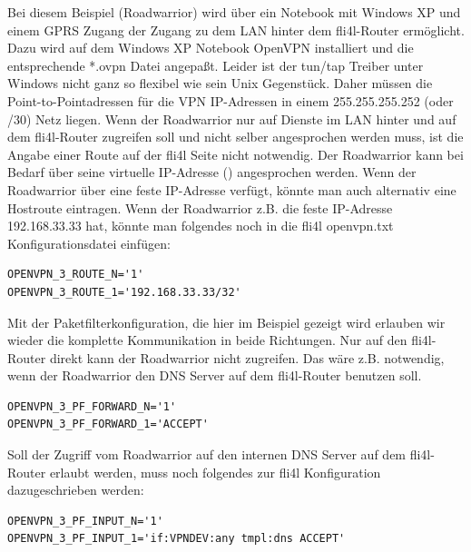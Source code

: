 Bei diesem Beispiel (Roadwarrior) wird über ein
Notebook mit Windows XP und einem GPRS Zugang der Zugang zu dem LAN
hinter dem fli4l-Router ermöglicht.  Dazu wird auf dem Windows XP
Notebook OpenVPN installiert und die entsprechende *.ovpn Datei
angepaßt.  Leider ist der tun/tap Treiber unter Windows nicht ganz so
flexibel wie sein Unix Gegenstück. Daher müssen die
Point-to-Pointadressen für die VPN IP-Adressen in einem
255.255.255.252 (oder /30) Netz liegen. Wenn der Roadwarrior nur auf
Dienste im LAN hinter und auf dem fli4l-Router zugreifen soll und
nicht selber angesprochen werden muss, ist die Angabe einer Route auf
der fli4l Seite nicht notwendig. Der Roadwarrior kann bei Bedarf über
seine virtuelle IP-Adresse ()
angesprochen werden. Wenn der Roadwarrior über eine feste IP-Adresse
verfügt, könnte man auch alternativ eine Hostroute eintragen. Wenn der
Roadwarrior z.B. die feste IP-Adresse 192.168.33.33 hat, könnte man
folgendes noch in die fli4l openvpn.txt Konfigurationsdatei einfügen:

\begin{example}
\begin{verbatim}
OPENVPN_3_ROUTE_N='1'
OPENVPN_3_ROUTE_1='192.168.33.33/32'
\end{verbatim}
\end{example}

Mit der Paketfilterkonfiguration, die hier im Beispiel gezeigt wird
erlauben wir wieder die komplette Kommunikation in beide
Richtungen. Nur auf den fli4l-Router direkt kann der Roadwarrior nicht
zugreifen. Das wäre z.B. notwendig, wenn der Roadwarrior den DNS
Server auf dem fli4l-Router benutzen soll.

\begin{example}
\begin{verbatim}
OPENVPN_3_PF_FORWARD_N='1'
OPENVPN_3_PF_FORWARD_1='ACCEPT'
\end{verbatim}
\end{example}

Soll der Zugriff vom Roadwarrior auf den internen DNS Server auf dem
fli4l-Router erlaubt werden, muss noch folgendes zur fli4l
Konfiguration dazugeschrieben werden:

\begin{example}
\begin{verbatim}
OPENVPN_3_PF_INPUT_N='1'
OPENVPN_3_PF_INPUT_1='if:VPNDEV:any tmpl:dns ACCEPT'
\end{verbatim}
\end{example}

